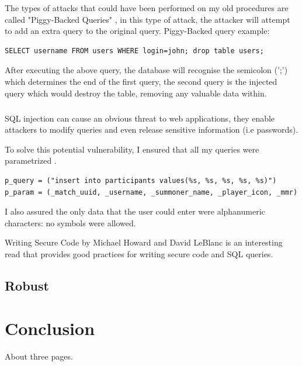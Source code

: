 The types of attacks that could have been performed on my old procedures are called "Piggy-Backed Queries" \cite{halfond2006classification}, in this type of attack, the attacker will attempt to add an extra query to the original query. 
\newline Piggy-Backed query example:

\begin{verbatim}
SELECT username FROM users WHERE login=john; drop table users;
\end{verbatim}

After executing the above query, the database will recognise the semicolon (';') which determines the end of the first query, the second query is the injected query which would destroy the table, removing any valuable data within.

\paragraph{}
SQL injection \cite{halfond2006classification} can cause an obvious threat to web applications, they enable attackers to modify queries and even release sensitive information (i.e passwords).

To solve this potential vulnerability, I ensured that all my queries were parametrized \cite{psycopg}.
\begin{verbatim}
p_query = ("insert into participants values(%s, %s, %s, %s, %s)")
p_param = (_match_uuid, _username, _summoner_name, _player_icon, _mmr)
\end{verbatim}
I also assured the only data that the user could enter were alphanumeric characters: no symbols were allowed.

Writing Secure Code\cite{howard2003writing} by Michael Howard and David LeBlanc is an interesting read that provides good practices for writing secure code and SQL queries.

\section{Robust}

\chapter{Conclusion}
About three pages.

